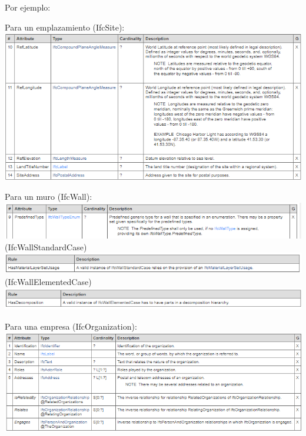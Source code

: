 \documentclass[spanish,12pt,a4paper,final,oneside]{book}
\begin{document}
Por ejemplo:
\begin{itemize}

\item Para un emplazamiento (IfcSite):
\\ \includegraphics[width=\textwidth]{atributos de IfcSite}

\begin{minipage}{\textwidth}
\item Para un muro (IfcWall):
\\ \includegraphics[width=\textwidth]{atributos de IfcWall}
\\ (IfcWallStandardCase)
\\ \includegraphics[width=\textwidth]{atributos de IfcWallStandardCase}
\\ (IfcWallElementedCase)
\\ \includegraphics[width=\textwidth]{atributos de IfcWallElementedCase}
\end{minipage}

\item Para una empresa (IfcOrganization):
\\ \includegraphics[width=\textwidth]{atributos de IfcOrganization}

\end{itemize}
\end{document}
